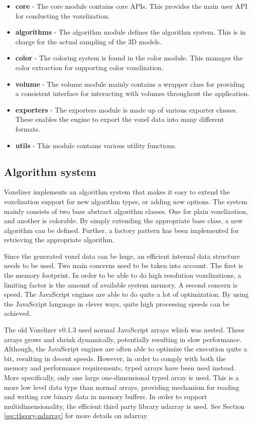 \begin{itemize}
    \item \textbf{core} - The core module contains core APIs. This provides the main user API for conducting the voxelization.
    \item \textbf{algorithms} - The algorithm module defines the algorithm system. This is in charge for the actual sampling of the 3D models.
    \item \textbf{color} - The coloring system is found in the color module. This manages the color extraction for supporting color voxelization.
    \item \textbf{volume} - The volume module mainly contains a wrapper class for providing a consistent interface for interacting with volumes throughout the application.  
    \item \textbf{exporters} - The exporters module is made up of various exporter classes. These enables the engine to export the voxel data into many different formats.
    \item \textbf{utils} - This module contains various utility functions.
\end{itemize}

\subsection{Algorithm system}
\label{sec:method-algorithm-system}
Voxelizer implements an algorithm system that makes it easy to extend the voxelization support for new algorithm types, or adding new options. The system mainly consists of two base abstract algorithm classes. One for plain voxelization, and another is colorable. By simply extending the appropriate base class, a new algorithm can be defined. Further, a factory pattern has been implemented for retrieving the appropriate algorithm.

Since the generated voxel data can be huge, an efficient internal data structure needs to be used. Two main concerns need to be taken into account. The first is the memory footprint. In order to be able to do high resolution voxelizations, a limiting factor is the amount of available system memory. A second concern is speed. The JavaScript engines are able to do quite a lot of optimization. By using the JavaScript language in clever ways, quite high processing speeds can be achieved.

The old Voxelizer v0.1.3 used normal JavaScript arrays which was nested. These arrays grows and shrink dynamically, potentially resulting in slow performance. Although, the JavaScript engines are often able to optimize the execution quite a bit, resulting in decent speeds. However, in order to comply with both the memory and performance requirements, typed arrays have been used instead. More specifically, only one large one-dimensional typed array is used. This is a more low level data type than normal arrays, providing mechanism for reading and writing raw binary data in memory buffers. In order to support multidimensionality, the efficient third party library ndarray is used. See Section \ref{sec:theory-ndarray} for more details on ndarray.

